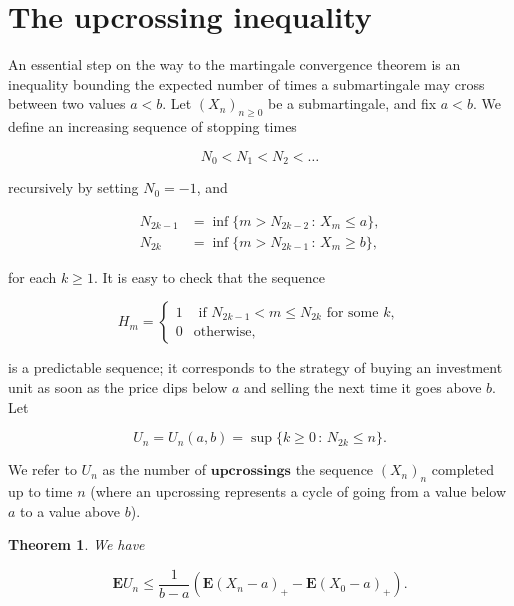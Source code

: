 \documentclass[11pt]{report}
\theoremstyle{plain}
\newtheorem{thm}{Theorem}[chapter]
\theoremstyle{definition}
\begin{document}
\section{The upcrossing inequality}

An essential step on the way to the martingale
convergence theorem is an inequality bounding the
expected number of times a submartingale may cross
between two values $a<b$. Let $(X_n)_{n\ge 0}$ be a
submartingale, and fix $a<b$. We define an increasing
sequence of stopping times

\[
N_0 < N_1 < N_2 < \ldots
\]

\noindent recursively by setting $N_0=-1$, and

\begin{align*}
N_{2k-1} &= \inf \{ m > N_{2k-2}\,:\,X_m\le a\}, \\
N_{2k} &= \inf \{ m > N_{2k-1}\,:\,X_m\ge b\},
\end{align*}

\noindent for each $k\ge 1$. It is easy to check that the
sequence

\[
H_m = \begin{cases} 1 &\textrm{ if }N_{2k-1}<m\le N_{2k}\textrm{ for some }k, \\
0 & \textrm{otherwise},
\end{cases}
\]

\noindent is a predictable sequence; it corresponds to the
strategy of buying an investment unit as soon as the
price dips below $a$ and selling the next time it
goes above $b$. Let

\[
U_n = U_n(a,b) = \sup \{ k\ge 0\,:\,N_{2k}\le n\}.
\]

\noindent We refer to $U_n$ as the number of
$\textbf{upcrossings}$ the sequence $(X_n)_n$
completed up to time $n$ (where an upcrossing
represents a cycle of going from a value below $a$ to
a value above $b$).

\begin{thm}
We have

\[
\mathbf{E} U_n \le \frac{1}{b-a}\left( \mathbf{E}(X_n-a)_+ - \mathbf{E}(X_0-a)_+ \right).
\]

\end{thm}
\end{document}
